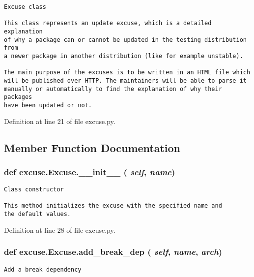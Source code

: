 \footnotesize\begin{verbatim}Excuse class

This class represents an update excuse, which is a detailed explanation
of why a package can or cannot be updated in the testing distribution from
a newer package in another distribution (like for example unstable).

The main purpose of the excuses is to be written in an HTML file which
will be published over HTTP. The maintainers will be able to parse it
manually or automatically to find the explanation of why their packages
have been updated or not.
\end{verbatim}
\normalsize
 



Definition at line 21 of file excuse.py.

\subsection{Member Function Documentation}
\subsubsection{\setlength{\rightskip}{0pt plus 5cm}def excuse.Excuse.\_\-\_\-init\_\-\_\- ( {\em self},  {\em name})}\label{classexcuse_1_1Excuse_4bdb0917f763d74951c621e466e98bdb}




\footnotesize\begin{verbatim}Class constructor

This method initializes the excuse with the specified name and
the default values.
\end{verbatim}
\normalsize
 

Definition at line 28 of file excuse.py.
\subsubsection{\setlength{\rightskip}{0pt plus 5cm}def excuse.Excuse.add\_\-break\_\-dep ( {\em self},  {\em name},  {\em arch})}\label{classexcuse_1_1Excuse_60e00fe0515f2dab003bd29baceedd34}




\footnotesize\begin{verbatim}Add a break dependency\end{verbatim}
\normalsize
 

